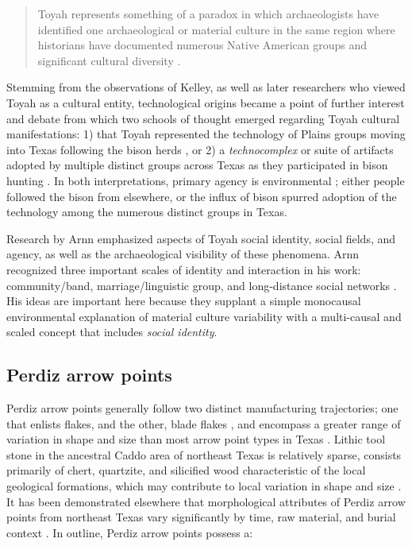 \documentclass[smallextended]{svjour3}       %
\begin{document}
\begin{quote}
Toyah represents something of a paradox in which archaeologists have
identified one archaeological or material culture in the same region
where historians have documented numerous Native American groups and
significant cultural diversity \cite[47]{RN9718}.
\end{quote}

Stemming from the observations of Kelley, as well as later researchers
who viewed Toyah as a cultural entity, technological origins became a
point of further interest and debate from which two schools of thought
emerged regarding Toyah cultural manifestations: 1) that Toyah
represented the technology of Plains groups moving into Texas following
the bison herds \cite{RN9721,RN9722}, or 2) a \emph{technocomplex} or
suite of artifacts adopted by multiple distinct groups across Texas as
they participated in bison hunting \cite{RN9008,RN9723,RN9724}. In both
interpretations, primary agency is environmental \cite{RN9718}; either
people followed the bison from elsewhere, or the influx of bison spurred
adoption of the technology among the numerous distinct groups in Texas.

Research by Arnn \cite{RN9718,RN9716,RN5784,RN9717} emphasized aspects
of Toyah social identity, social fields, and agency, as well as the
archaeological visibility of these phenomena. Arnn recognized three
important scales of identity and interaction in his work:
community/band, marriage/linguistic group, and long-distance social
networks \cite{RN9718}. His ideas are important here because they
supplant a simple monocausal environmental explanation of material
culture variability with a multi-causal and scaled concept that includes
\emph{social identity}.

\hypertarget{perdiz-arrow-points}{%
\subsection{Perdiz arrow points}\label{perdiz-arrow-points}}

Perdiz arrow points generally follow two distinct manufacturing
trajectories; one that enlists flakes, and the other, blade flakes
\cite{RN8999,RN9361,RN9000,RN9364}, and encompass a greater range of
variation in shape and size than most arrow point types in Texas
\cite{RN7795,RN3149}. Lithic tool stone in the ancestral Caddo area of
northeast Texas is relatively sparse, consists primarily of chert,
quartzite, and silicified wood characteristic of the local geological
formations, which may contribute to local variation in shape and size
\cite{RN9364,RN439}. It has been demonstrated elsewhere that
morphological attributes of Perdiz arrow points from northeast Texas
vary significantly by time, raw material, and burial context
\cite{RN9364}. In outline, Perdiz arrow points possess a:
\end{document}
